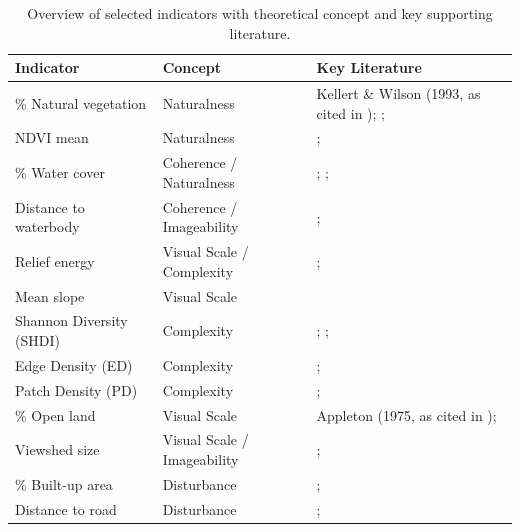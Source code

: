 \documentclass[hidelinks, 11pt]{article}
\begin{document}
\begin{table}[ht]
\centering
\caption{Overview of selected indicators with theoretical concept and key supporting literature.}
\label{tab:indicators}
\begin{tabular}{lll}
\toprule
\textbf{Indicator} & \textbf{Concept} & \textbf{Key Literature} \\
\midrule
\% Natural vegetation    & Naturalness                 & Kellert \& Wilson (1993, as cited in \citet{tveit_key_2006}); \citet{kaplan_experience_1989}; \citet{frank_assessment_2013} \\
\addlinespace
NDVI mean                & Naturalness                 & \citet{ode_capturing_2008}; \citet{arriaza_assessing_2004} \\
\addlinespace
\% Water cover           & Coherence / Naturalness     & \citet{white_blue_2010}; \citet{kaplan_experience_1989}; \citet{despotovic_beautiful_2025} \\
\addlinespace
Distance to waterbody    & Coherence / Imageability    & \citet{arriaza_assessing_2004}; \citet{white_blue_2010} \\
\addlinespace
Relief energy            & Visual Scale / Complexity   & \citet{schirpke_predicting_2013}; \citet{arriaza_assessing_2004} \\
\addlinespace
Mean slope               & Visual Scale                & \citet{schirpke_predicting_2013,schirpke_cultural_2016} \\
\addlinespace
Shannon Diversity (SHDI) & Complexity                  & \citet{frank_assessment_2013}; \citet{palmer_using_2004}; \citet{noauthor_fragstats_nodate} \\
\addlinespace
Edge Density (ED)        & Complexity                  & \citet{ode_capturing_2008}; \citet{germino_estimating_2001} \\
\addlinespace
Patch Density (PD)       & Complexity                  & \citet{frank_assessment_2013}; \citet{noauthor_fragstats_nodate} \\
\addlinespace
\% Open land             & Visual Scale                & Appleton (1975, as cited in \citet{tveit_key_2006}); \citet{ode_indicators_2009} \\
\addlinespace
Viewshed size            & Visual Scale / Imageability & \citet{ode_capturing_2008}; \citet{palmer_evaluating_1998} \\
\addlinespace
\% Built-up area         & Disturbance                 & \citet{van_der_jagt_unearthing_2014}; \citet{arriaza_assessing_2004} \\
\addlinespace
Distance to road         & Disturbance                 & \citet{gulinck_framework_2001}; \citet{arriaza_assessing_2004} \\
\bottomrule
\end{tabular}
\end{table}
\end{document}
